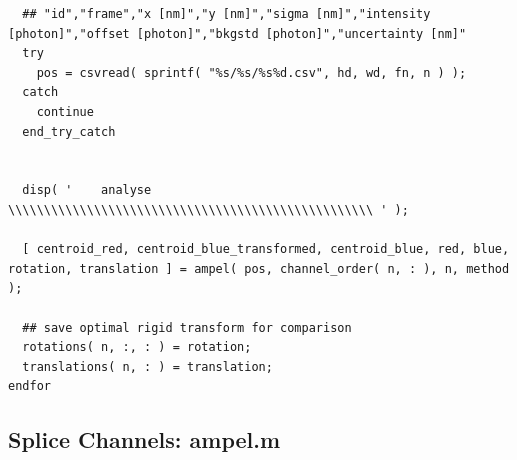 \documentclass[11pt, a4paper, oneside, twocolumn]{report}
\begin{document}
\begin{verbatim}
  ## "id","frame","x [nm]","y [nm]","sigma [nm]","intensity [photon]","offset [photon]","bkgstd [photon]","uncertainty [nm]"
  try
    pos = csvread( sprintf( "%s/%s/%s%d.csv", hd, wd, fn, n ) );
  catch
    continue
  end_try_catch
  
  
  disp( '    analyse \\\\\\\\\\\\\\\\\\\\\\\\\\\\\\\\\\\\\\\\\\\\\\\\\\\ ' );
  
  [ centroid_red, centroid_blue_transformed, centroid_blue, red, blue, rotation, translation ] = ampel( pos, channel_order( n, : ), n, method );
  
  ## save optimal rigid transform for comparison
  rotations( n, :, : ) = rotation;
  translations( n, : ) = translation;
endfor 
\end{verbatim}


\subsection{Splice Channels: ampel.m}\label{s:c:ampel}
\end{document}
